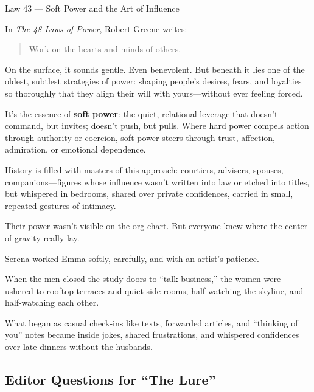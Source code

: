 \begin{PhilosophicalSidebar}{Law 43 --- Soft Power and the Art of Influence}

  In \textit{The 48 Laws of Power}, Robert Greene writes:
  
  \begin{quote}
    Work on the hearts and minds of others.
  \end{quote}
  
  On the surface, it sounds gentle. Even benevolent. But beneath it lies one of the oldest, subtlest strategies of 
  power: shaping people’s desires, fears, and loyalties so thoroughly that they align their will with yours—without 
  ever feeling forced.

  \medskip

  It’s the essence of \textbf{soft power}: the quiet, relational leverage that doesn’t command, but invites; doesn’t 
  push, but pulls. Where hard power compels action through authority or coercion, soft power steers through trust, 
  affection, admiration, or emotional dependence.
  
  \medskip
  
  History is filled with masters of this approach: courtiers, advisers, spouses, companions—figures whose influence 
  wasn’t written into law or etched into titles, but whispered in bedrooms, shared over private confidences, carried 
  in small, repeated gestures of intimacy.

  \medskip
  
  Their power wasn’t visible on the org chart.  But everyone knew where the center of gravity really lay.
  
\end{PhilosophicalSidebar}

\medskip

Serena worked Emma softly, carefully, and with an artist’s patience.  

When the men closed the study doors to ``talk business,'' the women were ushered to rooftop terraces and quiet side rooms, 
half-watching the skyline, and half-watching each other.  

What began as casual check-ins like texts, forwarded articles, and ``thinking of you'' notes became inside jokes, shared 
frustrations, and whispered confidences over late dinners without the husbands.  


\subsection*{Editor Questions for ``The Lure''}

